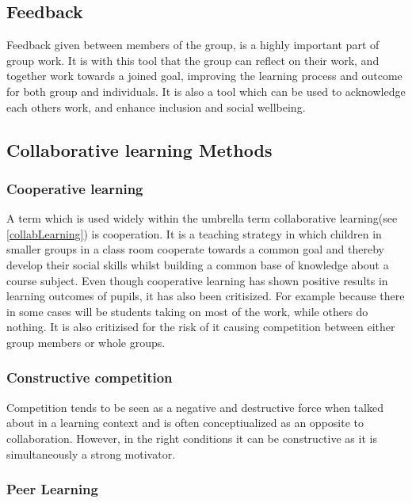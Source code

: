 \subsection{Feedback}
Feedback given between members of the group, is a highly important part of group work. It is with this tool that the group can reflect on their work, and together work towards a joined goal, improving the learning process and outcome for both group and individuals\cite{ProjektarbejdesKompleksitet}. It is also a tool which can be used to acknowledge each others work, and enhance inclusion and social wellbeing. 


\subsection{Collaborative learning Methods} %

\subsubsection{Cooperative learning}
A term which is used widely within the umbrella term collaborative learning(see \autoref{collabLearning}) is cooperation\cite{collaborationCooperation}. It is a teaching strategy in which children in smaller groups in a class room cooperate towards a common goal and thereby develop their social skills whilst building a common base of knowledge about a course subject\cite{collaborativeLearningTeachers}\cite[p.~15]{peerLearning}\cite{collaborationCompetition}. Even though cooperative learning has shown positive results in learning outcomes of pupils, it has also been critisized. For example because there in some cases will be students taking on most of the work, while others do nothing. It is also critizised for the risk of it causing competition between either group members or whole groups\cite{collaborationCooperation}.

\subsubsection{Constructive competition}
Competition tends to be seen as a negative and destructive force when talked about in a learning context and is often conceptiualized as an opposite to collaboration. However, in the right conditions it can be constructive as it is simultaneously a strong motivator\cite{collaborationCompetition}. %

\subsubsection{Peer Learning} %



